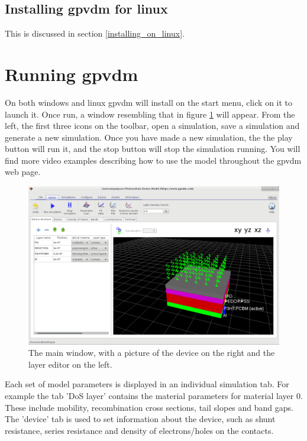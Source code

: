 \documentclass[11pt]{article}
\begin{document}
\subsection{Installing gpvdm for linux}
This is discussed in section \ref{installing_on_linux}.

\section{Running gpvdm}
On both windows and linux gpvdm will install on the start menu, click on it to launch it.  Once run, a window resembling that in figure \ref{fig:mainwindow} will appear.  From the left, the first three icons on the toolbar, open a simulation, save a simulation and generate a new simulation.  Once you have made a new simulation, the the play button will run it, and the stop button will stop the simulation running.  You will find more video examples describing how to use the model throughout the gpvdm web page.

\begin{figure}[ht!]
\centering
\includegraphics[width=140mm]{./images/main_window.png}
\caption{The main window, with a picture of the device on the right and the layer editor on the left.}
\label{fig:mainwindow}
\end{figure}

Each set of model parameters is displayed in an individual simulation tab.  For example the tab 'DoS layer' contains the material parameters for material layer 0.  These include mobility, recombination cross sections, tail slopes and band gaps.  The 'device' tab is used to set information about the device, such as shunt resistance, series resistance and density of electrons/holes on the contacts.
\end{document}
